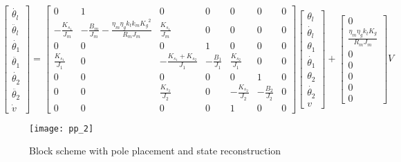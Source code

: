\begin{equation}
	\begin{bmatrix}
		\dot{\theta_l} \\
		\ddot{\theta_l} \\
		\dot{\theta_1} \\
		\ddot{\theta_1} \\
		\dot{\theta_2} \\
		\ddot{\theta_2} \\
		\dot{v}
	\end{bmatrix}
	=
	\begin{bmatrix}
		0 &1 & 0 & 0 & 0 & 0 & 0 \\
		-\frac{K_{s_1}}{J_m} & -\frac{B_m}{J_m}-\frac{\eta_m \eta_g k_t k_m {K_g}^2}{R_m J_m}  & \frac{K_{s_1}}{J_m} & 0 & 0 & 0 & 0 \\
		0 & 0 & 0 & 1 & 0 & 0 & 0\\
		\frac{K_{s_1}}{J_1} & 0 & -\frac{K_{s_1}+K_{s_2}}{J_1} & -\frac{B_1}{J_1} & \frac{K_{s_2}}{J_1} & 0 & 0\\
		0 & 0 & 0 & 0 & 0 & 1 & 0 \\
		0 & 0 & \frac{K_{s_2}}{J_2} & 0 & -\frac{K_{s_2}}{J_2} & -\frac{B_2}{J_2} & 0 \\
		0 & 0 & 0 & 0 & 1 & 0 & 0
	\end{bmatrix}
	\begin{bmatrix}
		\theta_l \\
		\dot{\theta_l} \\
		\theta_1 \\
		\dot{\theta_1} \\
		\theta_2 \\
		\dot{\theta_2} \\
		v 
	\end{bmatrix}
	+
	\begin{bmatrix}
		0 \\
		\frac{\eta_m \eta_g k_t K_g}{R_m J_m} \\
		0 \\
		0 \\
		0 \\
		0 \\
		0 
	\end{bmatrix}
	V
 \end{equation}


\begin{figure*}[h]
	\centering
	\texttt{[image: pp\_2]}
	\caption{Block scheme with pole placement and state reconstruction}
\end{figure*}

